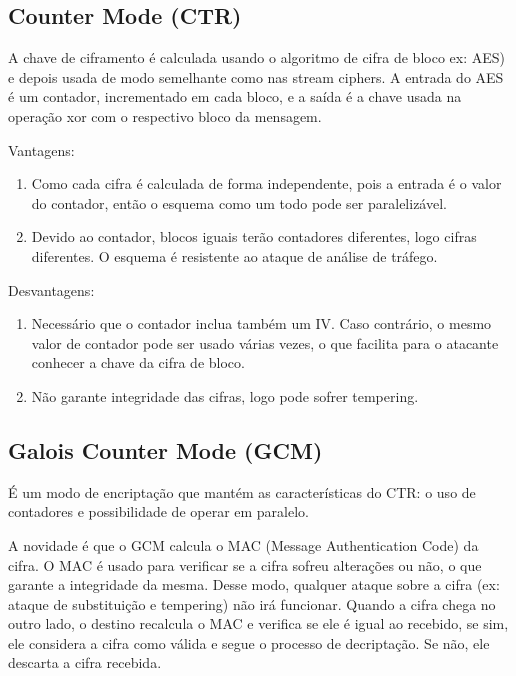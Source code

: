 \documentclass[a4paper]{article}
\begin{document}
\subsection{Counter Mode (CTR)}

A chave de ciframento é calculada usando o algoritmo de cifra de bloco ex: AES) e depois usada de modo semelhante como nas stream ciphers. A entrada
do AES é um contador, incrementado em cada bloco, e a saída é a chave usada na operação xor com o respectivo bloco da mensagem.

Vantagens:

\begin{enumerate}
\item Como cada cifra é calculada de forma independente, pois a entrada é o valor do contador, então o esquema como um todo
pode ser paralelizável.
\item Devido ao contador, blocos iguais terão contadores diferentes, logo cifras diferentes. O esquema é resistente ao ataque
de análise de tráfego.
\end{enumerate}

Desvantagens:

\begin{enumerate}
\item Necessário que o contador inclua também um IV. Caso contrário, o mesmo valor de contador pode ser usado várias vezes, o
que facilita para o atacante conhecer a chave da cifra de bloco.
\item Não garante integridade das cifras, logo pode sofrer tempering.
\end{enumerate}

\subsection{Galois Counter Mode (GCM)}

É um modo de encriptação que mantém as características do CTR: o uso de contadores e possibilidade de operar em paralelo.

A novidade é que o GCM calcula o MAC (Message Authentication Code) da cifra. O MAC é usado para verificar se a cifra sofreu alterações ou
não, o que garante a integridade da mesma. Desse modo, qualquer ataque sobre a cifra (ex: ataque de substituição e tempering) não irá
funcionar. Quando a cifra chega no outro lado, o destino recalcula o MAC e verifica se ele é igual ao recebido, se sim, ele considera
a cifra como válida e segue o processo de decriptação. Se não, ele descarta a cifra recebida.
\end{document}
